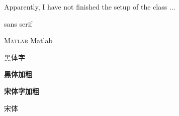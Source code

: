 \documentclass[fontset = mac ms]{seuthesis2024b}
\begin{document}
  Apparently, I have not finished the setup of the class ...
  
  \textsf{sans serif}

  \textsc{Matlab} Matlab

  \textsf{黑体字}

  \textbf{\textsf{黑体加粗}}
  
  \textbf{宋体字加粗}
  
  宋体
\end{document}
